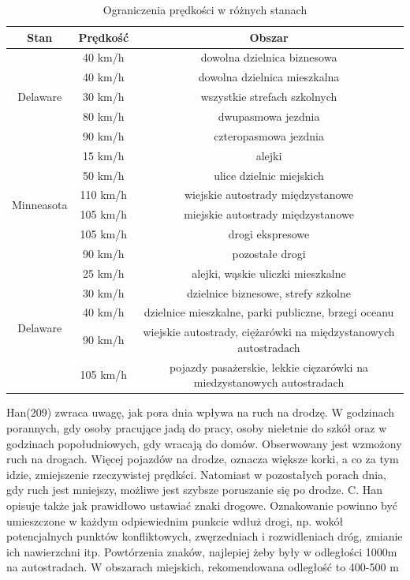 \begin{table}[ht]
\centering
\caption{Ograniczenia prędkości w różnych stanach}
\label{my-label}
\begin{tabular}{|c|c|c|}
\hline
\textbf{Stan}                    & \textbf{Prędkość} & \textbf{Obszar} \\ \hline
\multirow{5}{*}{Delaware}   & 40 km/h & dowolna dzielnica biznesowa \\ \cline{2-3}
& 40 km/h & dowolna dzielnica mieszkalna \\ \cline{2-3}
& 30 km/h & wszystkie strefach szkolnych \\ \cline{2-3}
& 80 km/h & dwupasmowa jezdnia \\ \cline{2-3}
& 90 km/h & czteropasmowa jezdnia \\ \hline

\multirow{6}{*}{Minneasota}   & 15 km/h & alejki \\ \cline{2-3}
& 50 km/h & ulice dzielnic miejskich \\ \cline{2-3}
& 110 km/h & wiejskie autostrady międzystanowe \\ \cline{2-3}
& 105 km/h & miejskie autostrady międzystanowe \\ \cline{2-3}
& 105 km/h & drogi ekspresowe \\ \cline{2-3}
& 90 km/h & pozostałe drogi \\ \hline

\multirow{5}{*}{Delaware}   & 25 km/h & alejki, wąskie uliczki mieszkalne  \\ \cline{2-3}
& 30 km/h & dzielnice biznesowe, strefy szkolne \\ \cline{2-3}
& 40 km/h & dzielnice mieszkalne, parki publiczne, brzegi oceanu \\ \cline{2-3}
& 90 km/h & wiejskie autostrady, ciężarówki na międzystanowych autostradach \\ \cline{2-3}
& 105 km/h & pojazdy pasażerskie, lekkie cięzarówki na miedzystanowych autostradach\\ \hline
\end{tabular}
\end{table} 


Han(209) zwraca uwagę, jak pora dnia wpływa na ruch na drodzę. W godzinach porannych, gdy osoby pracujące jadą do pracy, osoby nieletnie do szkół oraz w godzinach popołudniowych, gdy wracają do domów. Obserwowany jest wzmożony ruch na drogach. Więcej pojazdów na drodze, oznacza większe korki, a co za tym idzie, zmiejszenie rzeczywistej prędkści. Natomiast w pozostałych porach dnia, gdy ruch jest mniejszy, możliwe jest szybsze poruszanie się po drodze. C. Han opisuje także jak prawidłowo ustawiać znaki drogowe. Oznakowanie powinno być umieszczone w każdym odpiewiednim punkcie wdłuż drogi, np. wokół potencjalnych punktów konfliktowych, zwęrzedniach i rozwidleniach dróg, zmianie ich nawierzchni itp. Powtórzenia znaków, najlepiej żeby były w odległości 1000m na autostradach. W obszarach miejskich, rekomendowana odległość to 400-500 m
 


